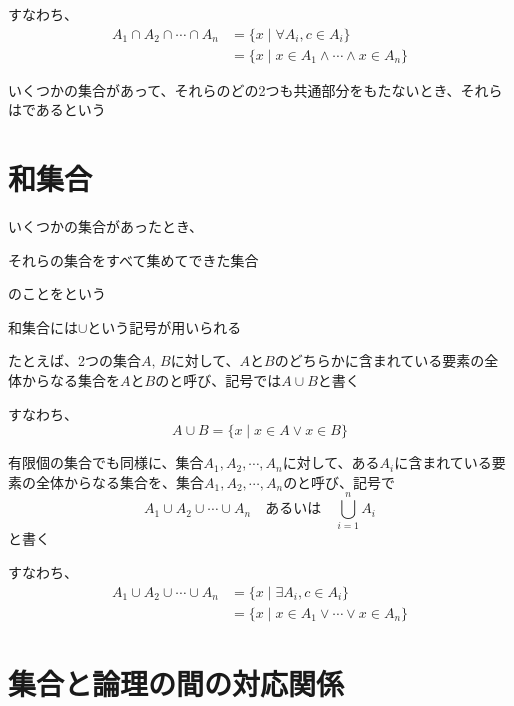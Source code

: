 \documentclass[../book_ronri-and-set]{subfiles}
\begin{document}
\br

すなわち、
\begin{align*}
  A_1 \cap A_2 \cap \cdots \cap A_n
   & = \{x \mid \forall A_i , c \in A_i \}               \\
   & = \{x \mid x \in A_1 \land \cdots \land x \in A_n\}
\end{align*}

\sectionline

いくつかの集合があって、それらのどの2つも共通部分をもたないとき、それらはであるという

\sectionline
\section{和集合}

いくつかの集合があったとき、
\begin{shaded*}
  それらの集合をすべて集めてできた集合
\end{shaded*}
のことをという

和集合には$\cup$という記号が用いられる

\sectionline

たとえば、2つの集合$A,\,B$に対して、$A$と$B$のどちらかに含まれている要素の全体からなる集合を$A$と$B$のと呼び、記号では$A \cup B$と書く

\br

すなわち、
\begin{equation*}
  A \cup B = \{x \mid x \in A \lor x \in B\}
\end{equation*}

\sectionline

有限個の集合でも同様に、集合$A_1, A_2, \cdots , A_n$に対して、ある$A_i$に含まれている要素の全体からなる集合を、集合$A_1, A_2, \cdots , A_n$のと呼び、記号で
\begin{equation*}
  A_1 \cup A_2 \cup \cdots \cup A_n \quad \text{あるいは} \quad \bigcup_{i=1}^n A_i
\end{equation*}
と書く

\br

すなわち、
\begin{align*}
  A_1 \cup A_2 \cup \cdots \cup A_n
   & = \{x \mid \exists A_i , c \in A_i \}             \\
   & = \{x \mid x \in A_1 \lor \cdots \lor x \in A_n\}
\end{align*}

\sectionline
\section{集合と論理の間の対応関係}
\end{document}
